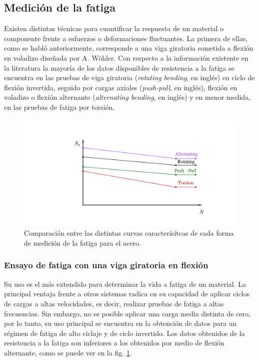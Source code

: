 \subsection{Medición de la fatiga}
Existen distintas técnicas para cuantificar la respuesta de un material o componente frente a esfuerzos o deformaciones fluctuantes. La primera de ellas, como se habló anteriormente, corresponde a una viga giratoria sometida a flexión en voladizo diseñada por A. Wöhler. Con respecto a la información existente en la literatura la mayoría de los datos disponibles de resistencia a la fatiga se encuentra en las pruebas de viga giratoria (\textit{rotating bending}, en inglés) en ciclo de flexión invertida, seguido por cargas axiales (\textit{push-pull}, en inglés), flexión en voladizo o flexión alternante (\textit{alternating bending}, en inglés) y en menor medida, en las pruebas de fatiga por torsión. \cite{norton2011machine}

\begin{figure}[h]
\centering
\includegraphics[width=0.9\linewidth, trim={11cm 2cm 6cm 4cm}, clip]{Imagenes/comp_medfat.pdf}
\caption{Comparación entre las distintas curvas caracterísitcas de cada forma de medición de la fatiga para el acero. \cite{lee2005fatigue}\cite{esin1980method}}
\label{fig:comp_medfat}
\end{figure}


\subsubsection{Ensayo de fatiga con una viga giratoria en flexión} 
Su uso es el más extendido para determinar la vida a fatiga de un material. La principal ventaja frente a otros sistemas radica en su capacidad de aplicar ciclos de cargas a altas velocidades, es decir, realizar pruebas de fatiga a altas frecuencias. Sin embargo, no es posible aplicar una carga media distinta de cero, por lo tanto, su uso principal se encuentra en la obtención de datos para un régimen de fatiga de alto ciclaje y de ciclo invertido. Los datos obtenidos de la resistencia a la fatiga son inferiores a los obtenidos por medio de flexión alternante, como se puede ver en la fig. \ref{fig:comp_medfat}.


